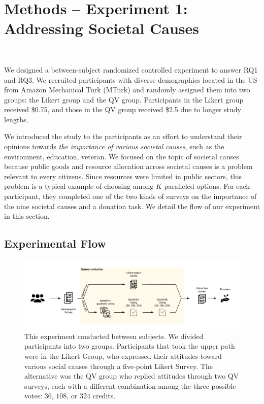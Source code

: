 \section{Methods -- Experiment 1: Addressing Societal Causes}~\label{method_exp1}

We designed a between-subject randomized controlled experiment to answer RQ1 and RQ3. We recruited participants with diverse demographics located in the US from Amazon Mechanical Turk (MTurk) and randomly assigned them into two groups: the Likert group and the QV group. Participants in the Likert group received \$0.75, and those in the QV group received \$2.5 due to longer study lengths. 

We introduced the study to the participants as an effort to understand their opinions towards \textit{the importance of various societal causes}, such as the environment, education, veteran. We focused on the topic of societal causes because public goods and resource allocation across societal causes is a problem relevant to every citizens. Since resources were limited in public sectors, this problem is a typical example of choosing among $K$ paralleled options. For each participant, they completed one of the two kinds of surveys on the importance of the nine societal causes and a donation task. We detail the flow of our experiment in this section.

\subsection{Experimental Flow}
\begin{figure}[htpb]
    \centering
    \includegraphics[width=\textwidth, keepaspectratio=true]{content/image/exp1_flow.pdf}
    \caption{
        This experiment conducted between subjects. We divided participants into two groups. Participants that took the upper path were in the Likert Group, who expressed their attitudes toward various social causes through a five-point Likert Survey. The alternative was the QV group who replied attitudes through two QV surveys, each with a different combination among the three possible votes: $36$, $108$, or $324$ credits.
    }
    \label{fig:exp1_image_flow}
\end{figure}

